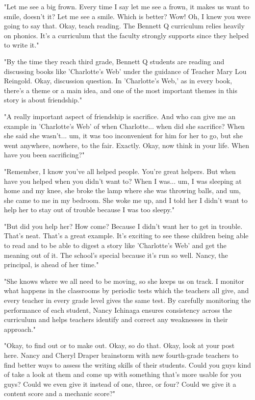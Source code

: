 "Let me see a big frown. Every time I say let me see a frown, it makes us want to smile, doesn't it? Let me see a smile. Which is better? Wow! Oh, I knew you were going to say that. Okay, teach reading. The Bennett Q curriculum relies heavily on phonics. It's a curriculum that the faculty strongly supports since they helped to write it."

"By the time they reach third grade, Bennett Q students are reading and discussing books like 'Charlotte's Web' under the guidance of Teacher Mary Lou Reingold. Okay, discussion question. In 'Charlotte's Web,' as in every book, there's a theme or a main idea, and one of the most important themes in this story is about friendship."

"A really important aspect of friendship is sacrifice. And who can give me an example in 'Charlotte's Web' of when Charlotte... when did she sacrifice? When she said she wasn't... um, it was too inconvenient for him for her to go, but she went anywhere, nowhere, to the fair. Exactly. Okay, now think in your life. When have you been sacrificing?"

"Remember, I know you've all helped people. You're great helpers. But when have you helped when you didn't want to? When I was... um, I was sleeping at home and my knee, she broke the lamp where she was throwing balls, and um, she came to me in my bedroom. She woke me up, and I told her I didn't want to help her to stay out of trouble because I was too sleepy."

"But did you help her? How come? Because I didn't want her to get in trouble. That's neat. That's a great example. It's exciting to see these children being able to read and to be able to digest a story like 'Charlotte's Web' and get the meaning out of it. The school's special because it's run so well. Nancy, the principal, is ahead of her time."

"She knows where we all need to be moving, so she keeps us on track. I monitor what happens in the classrooms by periodic tests which the teachers all give, and every teacher in every grade level gives the same test. By carefully monitoring the performance of each student, Nancy Ichinaga ensures consistency across the curriculum and helps teachers identify and correct any weaknesses in their approach."

"Okay, to find out or to make out. Okay, so do that. Okay, look at your post here. Nancy and Cheryl Draper brainstorm with new fourth-grade teachers to find better ways to assess the writing skills of their students. Could you guys kind of take a look at them and come up with something that's more usable for you guys? Could we even give it instead of one, three, or four? Could we give it a content score and a mechanic score?"

